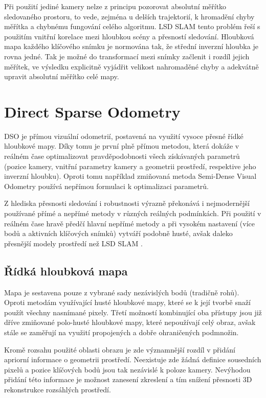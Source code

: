 \documentclass[12pt,a4paper]{report}
\begin{document}
Při použití jediné kamery nelze z principu pozorovat absolutní měřítko sledovaného prostoru, to vede, zejména u delších trajektorií, k hromadění chyby měřítka a chybnému fungování celého algoritmu. LSD SLAM tento problém řeší s použitím vnitřní korelace mezi hloubkou scény a přesností sledování. Hloubková mapa každého klíčového snímku je normována tak, že střední inverzní hloubka je rovna jedné. Tak je možné do transformací mezi snímky začlenit i rozdíl jejich měřítek, ve výsledku explicitně vyjádřit velikost nahromaděné chyby a adekvátně upravit absolutní měřítko celé mapy.

\section{Direct Sparse Odometry}
DSO je přímou vizuální odometrií, postavená na využití vysoce přesné řídké hloubkové mapy. Díky tomu je první plně přímou metodou, která dokáže v reálném čase optimalizovat pravděpodobnosti všech získávaných parametrů (pozice kamery, vnitřní parametry kamery a geometrii prostředí, respektive jeho inverzní hloubku). Oproti tomu například zmiňovaná metoda Semi-Dense Visual Odometry používá nepřímou formulaci k optimalizaci parametrů.

Z hlediska přesnosti sledování i robustnosti výrazně překonává i nejmodernější použí\-vané přímé a nepřímé metody v různých reálných podmínkách. Při použití v reálném čase hravě předčí hlavní nepřímé metody a při vysokém nastavení (více bodů a aktivních klíčových snímků) vytváří podobně husté, avšak daleko přesnější modely prostředí než LSD SLAM \cite{Engel2018_DSO}.

\subsection*{Řídká hloubková mapa} Mapa je sestavena pouze z vybrané sady nezávislých bodů (tradičně rohů). Oproti metodám využívající husté hloubkové mapy, které se k její tvorbě snaží použít všechny nasnímané pixely. Třetí možností kombinující oba přístupy jsou již dříve zmiňované polo-husté hloubkové mapy, které nepoužívají celý obraz, avšak stále se zaměřují na využití propojených a dobře ohraničených podmnožin. 

Kromě rozsahu použité oblasti obrazu je zde významnější rozdíl v přidání apriorní informace o geometrii prostředí. Neexistuje zde žádná definice sousedních pixelů a pozice klíčových bodů jsou tak nezávislé k poloze kamery. Nevýhodou přidání této informace je možnost zanesení zkreslení a tím snížení přesnosti 3D rekonstrukce rozsáhlých prostředí. 
\end{document}
